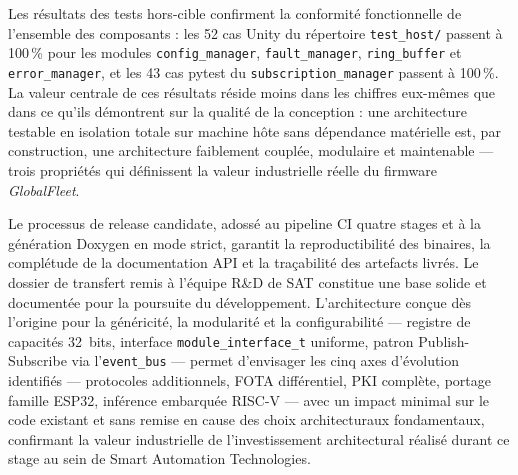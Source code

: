 Les résultats des tests hors-cible confirment la conformité
fonctionnelle de l'ensemble des composants : les 52 cas Unity du
répertoire \texttt{test\_host/} passent à 100\,\% pour les modules
\texttt{config\_manager}, \texttt{fault\_manager}, \texttt{ring\_buffer}
et \texttt{error\_manager}, et les 43 cas pytest du
\texttt{subscription\_manager} passent à 100\,\%. La valeur centrale
de ces résultats réside moins dans les chiffres eux-mêmes que dans
ce qu'ils démontrent sur la qualité de la conception : une architecture
testable en isolation totale sur machine hôte sans dépendance matérielle
est, par construction, une architecture faiblement couplée, modulaire
et maintenable — trois propriétés qui définissent la valeur industrielle
réelle du firmware \textit{GlobalFleet}.

Le processus de release candidate, adossé au pipeline CI quatre stages
et à la génération Doxygen en mode strict, garantit la reproductibilité
des binaires, la complétude de la documentation API et la traçabilité
des artefacts livrés. Le dossier de transfert remis à l'équipe R\&D
de SAT constitue une base solide et documentée pour la poursuite du
développement. L'architecture conçue dès l'origine pour la généricité,
la modularité et la configurabilité — registre de capacités 32~bits,
interface \texttt{module\_interface\_t} uniforme, patron Publish-Subscribe
via l'\texttt{event\_bus} — permet d'envisager les cinq axes d'évolution
identifiés — protocoles additionnels, FOTA différentiel, PKI complète,
portage famille ESP32, inférence embarquée RISC-V — avec un impact
minimal sur le code existant et sans remise en cause des choix
architecturaux fondamentaux, confirmant la valeur industrielle de
l'investissement architectural réalisé durant ce stage au sein de
Smart Automation Technologies.

